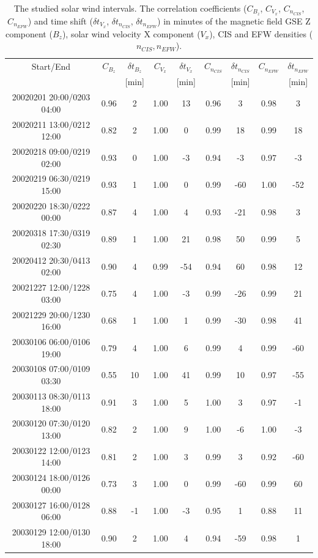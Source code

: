 \documentclass[linenumbers,draft]{agujournal}
\begin{document}
\begin{table}[h]
\setlength{\tabcolsep}{3pt}
\centering
\begin{tabular}{c||cc|cc|cc|cc}
\hline
Start/End & $C_{B_{z}}$ & $\delta t_{B_{z}}$ & $C_{V_{x}}$ & $\delta t_{V_{x}}$ & $C_{n_{CIS}}$ & $\delta t_{n_{CIS}}$ & $C_{n_{EFW}}$ & $\delta t_{n_{EFW}}$ \\
& & [min] & & [min] & & [min] & & [min] \\
\hline
20020201 20:00/0203 04:00 & 0.96 & 2 & 1.00 & 13 & 0.96 & 3 & 0.98 & 3 \\
20020211 13:00/0212 12:00 & 0.82 & 2 & 1.00 & 0 & 0.99 & 18 & 0.99 & 18 \\
20020218 09:00/0219 02:00 & 0.93 & 0 & 1.00 & -3 & 0.94 & -3 & 0.97 & -3 \\
20020219 06:30/0219 15:00 & 0.93 & 1 & 1.00 & 0 & 0.99 & -60 & 1.00 & -52 \\
20020220 18:30/0222 00:00 & 0.87 & 4 & 1.00 & 4 & 0.93 & -21 & 0.98 & 3 \\
20020318 17:30/0319 02:30 & 0.89 & 1 & 1.00 & 21 & 0.98 & 50 & 0.99 & 5 \\
20020412 20:30/0413 02:00 & 0.90 & 4 & 0.99 & -54 & 0.94 & 60 & 0.98 & 12 \\
20021227 12:00/1228 03:00 & 0.75 & 4 & 1.00 & -3 & 0.99 & -26 & 0.99 & 21 \\
20021229 20:00/1230 16:00 & 0.68 & 1 & 1.00 & 1 & 0.99 & -30 & 0.98 & 41 \\
20030106 06:00/0106 19:00 & 0.79 & 4 & 1.00 & 6 & 0.99 & 4 & 0.99 & -60 \\
20030108 07:00/0109 03:30 & 0.55 & 10 & 1.00 & 41 & 0.99 & 10 & 0.97 & -55 \\
20030113 08:30/0113 18:00 & 0.91 & 3 & 1.00 & 5 & 1.00 & 3 & 0.97 & -1 \\
20030120 07:30/0120 13:00 & 0.82 & 2 & 1.00 & 9 & 1.00 & -6 & 1.00 & -3 \\
20030122 12:00/0123 14:00 & 0.81 & 2 & 1.00 & 3 & 0.99 & 3 & 0.92 & -60 \\
20030124 18:00/0126 00:00 & 0.73 & 3 & 1.00 & 0 & 0.99 & -60 & 0.99 & 60 \\
20030127 16:00/0128 06:00 & 0.88 & -1 & 1.00 & -3 & 0.95 & 1 & 0.88 & 11 \\
20030129 12:00/0130 18:00 & 0.90 & 2 & 1.00 & 4 & 0.94 & -59 & 0.98 & 1 \\
\hline
\end{tabular}
\caption{The studied solar wind intervals.  The correlation coefficients ($C_{B_{z}}$, $C_{V_{x}}$, $C_{n_{CIS}}$, $C_{n_{EFW}}$) and time shift ($\delta t_{V_{x}}$, $\delta t_{n_{CIS}}$, $\delta t_{n_{EFW}}$) in minutes of the magnetic field GSE Z component ($B_z$), solar wind velocity X component ($V_x$), CIS and EFW densities ($n_{CIS}, n_{EFW}$).\label{tab:sw}}
\end{table}
\end{document}
